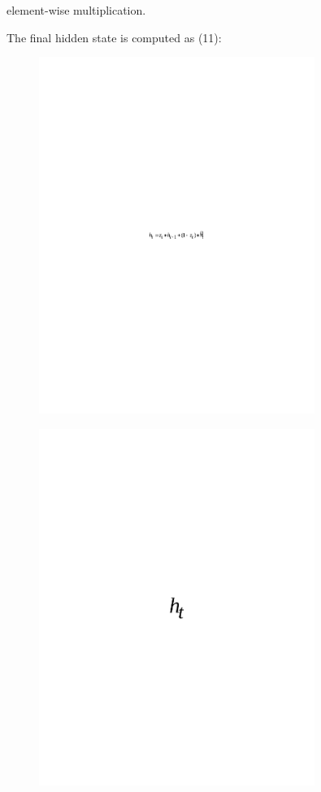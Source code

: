 element-wise multiplication.

The final hidden state is computed as (11):

\begin{figure}[H]
	\centering
	\includegraphics[width=0.8\textwidth]{media/ict/image76}
	\caption*{}
\end{figure}


\begin{figure}[H]
	\centering
	\includegraphics[width=0.8\textwidth]{media/ict/image77}
	\caption*{}
\end{figure}

